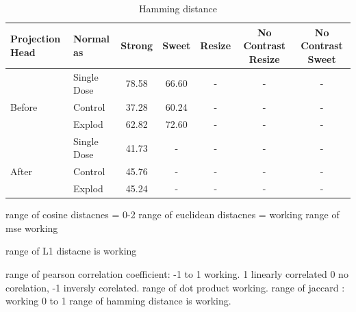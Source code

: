 \begin{table}[H]
  \centering
  \begin{tabular}{@{}llccccc@{}}
  \toprule
  Projection Head & Normal as       & Strong & Sweet & Resize & No Contrast Resize & No Contrast Sweet \\ \midrule
                  & Single Dose    & 78.58      & 66.60     & -      & -                  & -                 \\
  Before          & Control        & 37.28      & 60.24     & -      & -                  & -                 \\
                  & Explod         & 62.82      & 72.60     & -      & -                  & -                 \\ \midrule
                  & Single Dose    & 41.73      & -     & -      & -                  & -                 \\
  After           & Control        & 45.76      & -     & -      & -                  & -                 \\
                  & Explod         & 45.24      & -     & -      & -                  & -                 \\ \bottomrule
  \end{tabular}
  \caption{Hamming  distance}
  \label{tab:table_label}
\end{table}




range of cosine distacnes = 0-2
range of euclidean distacnes = working
range of mse working

range of L1 distacne is working

range of pearson correlation coefficient: -1 to 1 working. 1 linearly correlated 0 no corelation, -1 inversly corelated.
range of dot product  working.
range of jaccard : working 0 to 1
range of hamming distance is working.


